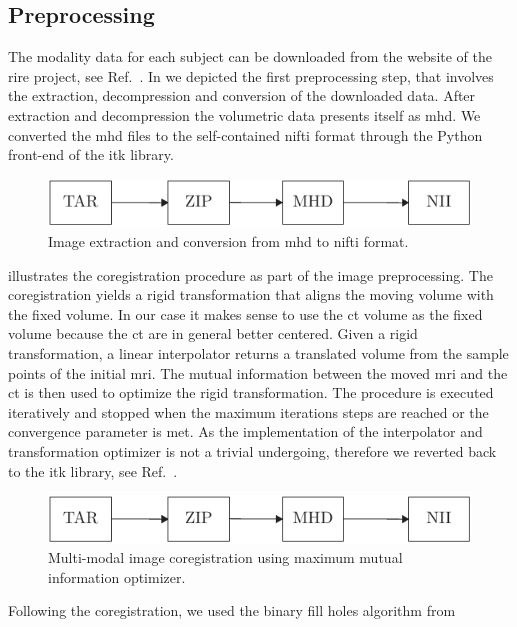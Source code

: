 \subsection{Preprocessing}

The modality data for each subject can be downloaded from the website of the
\gls{rire} project, see Ref.~\cite{RIRE}. In  we depicted
the first preprocessing step, that involves the extraction, decompression and
conversion of the downloaded data. After extraction and decompression the
volumetric data presents itself as \gls{mhd}. We converted the \gls{mhd} files
to the self-contained \gls{nifti} format through the Python front-end of the
\gls{itk} library.
\begin{figure}[h]
  \centering
  \includegraphics[page=1,width=.8\linewidth]{figure/diagrams.pdf}
  \caption{Image extraction and conversion from \gls{mhd} to \gls{nifti}
		format.
	}\label{fig:conversion}
\end{figure}
 illustrates the coregistration procedure as part of
the image preprocessing. The coregistration yields a rigid transformation that
aligns the moving volume with the fixed volume. In our case it makes sense to
use the \gls{ct} volume as the fixed volume because the \gls{ct} are in
general better centered. Given a rigid transformation, a linear interpolator
returns a translated volume from the sample points of the initial \gls{mri}.
The mutual information between the moved \gls{mri} and the \gls{ct} is then
used to optimize the rigid transformation. The procedure is executed
iteratively and stopped when the maximum iterations steps are reached or
the convergence parameter is met. As the implementation of the interpolator
and transformation optimizer is not a trivial undergoing, therefore we
reverted back to the \gls{itk} library, see Ref.~\cite{Yaniv2018}.
\begin{figure}[h]
  \centering
  \includegraphics[page=2,width=.8\linewidth]{figure/diagrams.pdf}
  \caption{Multi-modal image coregistration using maximum mutual information
    optimizer.
	}\label{fig:registration}
\end{figure}
Following the coregistration, we used the binary fill holes algorithm from
